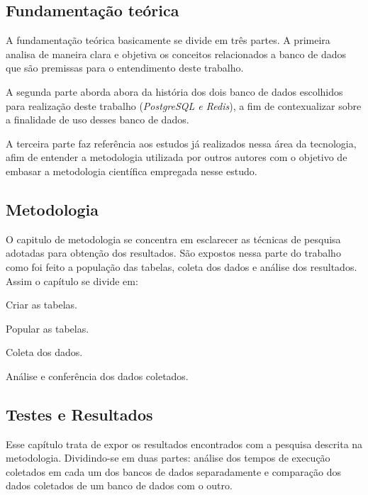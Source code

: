 
\subsection{Fundamentação teórica}

A fundamentação teórica basicamente se divide em três partes. A primeira analisa de maneira clara e objetiva os conceitos relacionados a banco de dados que são premissas para o entendimento deste trabalho. 

A segunda parte aborda abora da história dos dois banco de dados escolhidos para realização deste trabalho (\textit{PostgreSQL e Redis}), a fim de contexualizar sobre a finalidade de uso desses banco de dados. 

A terceira parte faz referência aos estudos já realizados nessa área da tecnologia, afim de entender a metodologia utilizada por outros autores com o objetivo de embasar a metodologia científica empregada nesse estudo. 

\subsection{Metodologia}
O  capitulo  de  metodologia  se  concentra  em  esclarecer  as  técnicas  de  pesquisa adotadas  para  obtenção  dos  resultados.  São expostos nessa parte do trabalho como foi feito a população das tabelas, coleta dos dados e análise dos resultados. Assim o capítulo se divide em: 

\begin{compactitem}
	\item Criar as tabelas.
    \item Popular as tabelas.
    \item Coleta dos dados.
    \item Análise e conferência dos dados coletados.
\end{compactitem}

\subsection{Testes e Resultados}
Esse capítulo trata de expor os resultados encontrados com a pesquisa descrita na metodologia. Dividindo-se em duas partes: análise dos tempos de execução coletados em cada um dos bancos de dados separadamente e comparação dos dados coletados de um banco de dados com o outro.

